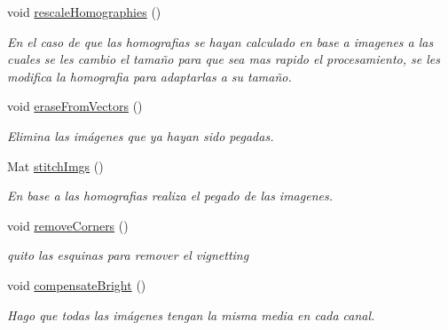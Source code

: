 \begin{DoxyCompactItemize}
\mbox{\label{classuav_1_1Stitcher_a26bf84ee9e54a9f2f4c9d640554d7067}} 
void \mbox{\hyperlink{classuav_1_1Stitcher_a26bf84ee9e54a9f2f4c9d640554d7067}{rescale\+Homographies}} ()
\begin{DoxyCompactList}\small\item\em En el caso de que las homografias se hayan calculado en base a imagenes a las cuales se les cambio el tamaño para que sea mas rapido el procesamiento, se les modifica la homografia para adaptarlas a su tamaño. \end{DoxyCompactList}\item 
\mbox{\label{classuav_1_1Stitcher_a58dc76aa6524d65d9af960d12effe26b}} 
void \mbox{\hyperlink{classuav_1_1Stitcher_a58dc76aa6524d65d9af960d12effe26b}{erase\+From\+Vectors}} ()
\begin{DoxyCompactList}\small\item\em Elimina las imágenes que ya hayan sido pegadas. \end{DoxyCompactList}\item 
Mat \mbox{\hyperlink{classuav_1_1Stitcher_a650ea572d679be3b9ca07e142508a324}{stitch\+Imgs}} ()
\begin{DoxyCompactList}\small\item\em En base a las homografias realiza el pegado de las imagenes. \end{DoxyCompactList}\item 
\mbox{\label{classuav_1_1Stitcher_ab52ee0552b5e12dae2cd157ddc29cab2}} 
void \mbox{\hyperlink{classuav_1_1Stitcher_ab52ee0552b5e12dae2cd157ddc29cab2}{remove\+Corners}} ()
\begin{DoxyCompactList}\small\item\em quito las esquinas para remover el vignetting \end{DoxyCompactList}\item 
\mbox{\label{classuav_1_1Stitcher_a75bb9ec1e173c137d53f650dd9077460}} 
void \mbox{\hyperlink{classuav_1_1Stitcher_a75bb9ec1e173c137d53f650dd9077460}{compensate\+Bright}} ()
\begin{DoxyCompactList}\small\item\em Hago que todas las imágenes tengan la misma media en cada canal. \end{DoxyCompactList}\item 

\end{DoxyCompactItemize}
